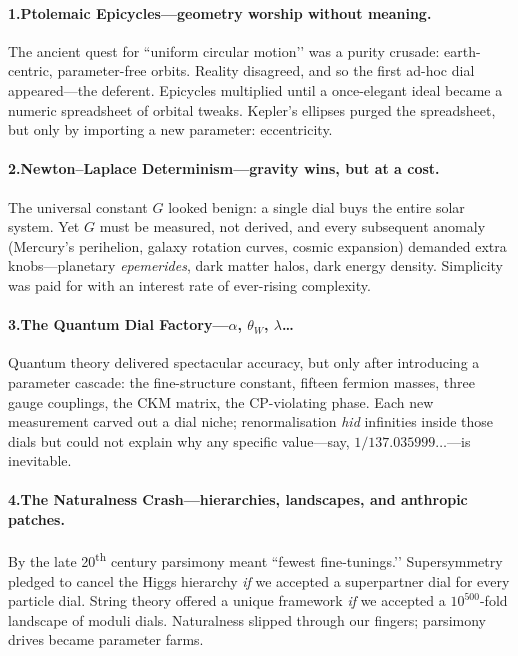 \documentclass[11pt,oneside]{book}
\begin{document}
\paragraph*{1.\;Ptolemaic Epicycles—geometry worship without meaning.}
The ancient quest for “uniform circular motion’’ was a purity crusade:
earth-centric, parameter-free orbits.  Reality disagreed, and so the
first ad-hoc dial appeared—the deferent.  Epicycles multiplied until
a once-elegant ideal became a numeric spreadsheet of orbital tweaks.
Kepler’s ellipses purged the spreadsheet, but only by importing a new
parameter: eccentricity.

\paragraph*{2.\;Newton–Laplace Determinism—gravity wins, but at a cost.}
The universal constant \(G\) looked benign: a single dial buys the entire
solar system.  Yet \(G\) must be measured, not derived, and every
subsequent anomaly (Mercury’s perihelion, galaxy rotation curves,
cosmic expansion) demanded extra knobs—planetary \textit{epemerides},
dark matter halos, dark energy density.  Simplicity was paid for with an
interest rate of ever-rising complexity.

\paragraph*{3.\;The Quantum Dial Factory—\(\alpha\), \(\theta_W\),
\(\lambda\)\dots}
Quantum theory delivered spectacular accuracy, but only after
introducing a parameter cascade: the fine-structure constant, fifteen
fermion masses, three gauge couplings, the CKM matrix, the CP-violating
phase.  Each new measurement carved out a dial niche; renormalisation
\emph{hid} infinities inside those dials but could not explain why any
specific value—say, \(1/137.035999\ldots\)—is inevitable.

\paragraph*{4.\;The Naturalness Crash—hierarchies, landscapes, and
anthropic patches.}
By the late 20\textsuperscript{th} century parsimony meant “fewest
fine-tunings.’’  Supersymmetry pledged to cancel the Higgs hierarchy
\emph{if} we accepted a superpartner dial for every particle dial.
String theory offered a unique framework \emph{if} we accepted a
\(10^{500}\)-fold landscape of moduli dials.  Naturalness slipped
through our fingers; parsimony drives became parameter farms.
\end{document}

